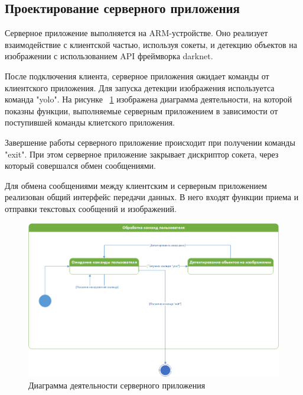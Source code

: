 \documentclass[a4paper,english,russian]{G2-105}
\begin{document}
\subsection{Проектирование серверного приложения}
\par Серверное приложение выполняется на ARM-устройстве. Оно реализует взаимодействие с клиентской частью, используя сокеты, и детекцию объектов на изображении с использованием API фреймворка darknet.
\par После подключения клиента, серверное приложения ожидает команды от клиентского приложения. Для запуска детекции изображения используетса команда "yolo". На рисунке ~\ref{state} изображена диаграмма деятельности, на которой показны функции, выполняемые серверным приложением в зависимости от поступившей команды клиетского приложения.
\par Завершение работы серверного приложение происходит при получении команды "exit". При этом серверное приложение закрывает дискриптор сокета, через который совершался обмен сообщениями.
\par Для обмена сообщениями между клиентским и серверным приложением реализован общий интерфейс передачи данных. В него входят функции приема и отправки текстовых сообщений и изображений.
\begin{figure}
    \includegraphics[width=\linewidth]{statediagramserver.png}
    \caption{Диаграмма деятельности серверного приложения}
	\label{state}
\end{figure}
\ttl
\end{document}
